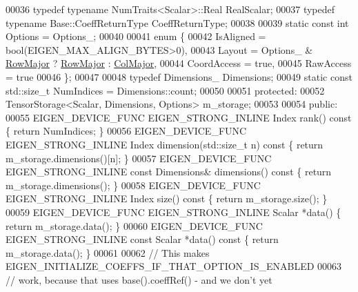 \begin{DoxyCode}
00036     \textcolor{keyword}{typedef} \textcolor{keyword}{typename} NumTraits<Scalar>::Real RealScalar;
00037     \textcolor{keyword}{typedef} \textcolor{keyword}{typename} Base::CoeffReturnType CoeffReturnType;
00038 
00039     \textcolor{keyword}{static} \textcolor{keyword}{const} \textcolor{keywordtype}{int} Options = Options\_;
00040 
00041     \textcolor{keyword}{enum} \{
00042       IsAligned = bool(EIGEN\_MAX\_ALIGN\_BYTES>0),
00043       Layout = Options\_ & \hyperlink{group__enums_ggaacded1a18ae58b0f554751f6cdf9eb13acfcde9cd8677c5f7caf6bd603666aae3}{RowMajor} ? \hyperlink{group__enums_ggaacded1a18ae58b0f554751f6cdf9eb13acfcde9cd8677c5f7caf6bd603666aae3}{RowMajor} : \hyperlink{group__enums_ggaacded1a18ae58b0f554751f6cdf9eb13a0cbd4bdd0abcfc0224c5fcb5e4f6669a}{ColMajor},
00044       CoordAccess = \textcolor{keyword}{true},
00045       RawAccess = \textcolor{keyword}{true}
00046     \};
00047 
00048   \textcolor{keyword}{typedef} Dimensions\_ Dimensions;
00049   \textcolor{keyword}{static} \textcolor{keyword}{const} std::size\_t NumIndices = Dimensions::count;
00050 
00051   \textcolor{keyword}{protected}:
00052   TensorStorage<Scalar, Dimensions, Options> m\_storage;
00053 
00054   \textcolor{keyword}{public}:
00055     EIGEN\_DEVICE\_FUNC EIGEN\_STRONG\_INLINE Index                    rank()\textcolor{keyword}{                   const }\{ \textcolor{keywordflow}{return} 
      NumIndices; \}
00056     EIGEN\_DEVICE\_FUNC EIGEN\_STRONG\_INLINE Index                    dimension(std::size\_t n)\textcolor{keyword}{ const }\{ \textcolor{keywordflow}{return} 
      m\_storage.dimensions()[n]; \}
00057     EIGEN\_DEVICE\_FUNC EIGEN\_STRONG\_INLINE \textcolor{keyword}{const} Dimensions&        dimensions()\textcolor{keyword}{             const }\{ \textcolor{keywordflow}{return} 
      m\_storage.dimensions(); \}
00058     EIGEN\_DEVICE\_FUNC EIGEN\_STRONG\_INLINE Index                    size()\textcolor{keyword}{                   const }\{ \textcolor{keywordflow}{return} 
      m\_storage.size(); \}
00059     EIGEN\_DEVICE\_FUNC EIGEN\_STRONG\_INLINE Scalar                   *data()                        \{ \textcolor{keywordflow}{return} 
      m\_storage.data(); \}
00060     EIGEN\_DEVICE\_FUNC EIGEN\_STRONG\_INLINE \textcolor{keyword}{const} Scalar             *data()\textcolor{keyword}{                  const }\{ \textcolor{keywordflow}{return} 
      m\_storage.data(); \}
00061 
00062     \textcolor{comment}{// This makes EIGEN\_INITIALIZE\_COEFFS\_IF\_THAT\_OPTION\_IS\_ENABLED}
00063     \textcolor{comment}{// work, because that uses base().coeffRef() - and we don't yet}

\end{DoxyCode}
